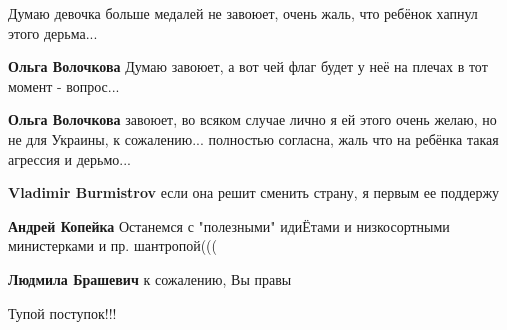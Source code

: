\begin{itemize}
Думаю девочка больше медалей не завоюет, очень жаль, что ребёнок хапнул этого
дерьма...

\begin{itemize}

 
\textbf{Ольга Волочкова} Думаю завоюет, а вот чей флаг будет у неё на плечах в тот момент - вопрос...


 
\textbf{Ольга Волочкова} завоюет, во всяком случае лично я ей этого очень желаю, но не для Украины, к сожалению... полностью согласна, жаль что на ребёнка такая агрессия и дерьмо...


\textbf{Vladimir Burmistrov} если она решит сменить страну, я первым ее поддержу

 
\textbf{Андрей Копейка} Останемся с "полезными" идиЁтами и низкосортными министерками и пр. шантропой(((



 
\textbf{Людмила Брашевич} к сожалению, Вы правы
\end{itemize}

 
Тупой поступок!!!

 

\end{itemize}
